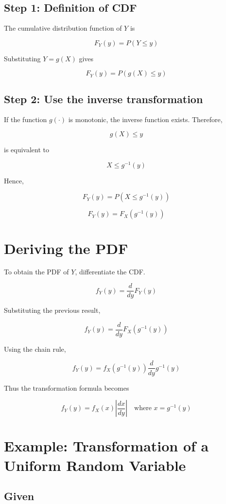 \documentclass[11pt]{article}
\begin{document}
\subsection{Step 1: Definition of CDF}

The cumulative distribution function of $Y$ is

\[
F_Y(y) = P(Y \le y)
\]

Substituting $Y = g(X)$ gives

\[
F_Y(y) = P(g(X) \le y)
\]

\subsection{Step 2: Use the inverse transformation}

If the function $g(\cdot)$ is monotonic, the inverse function exists. Therefore,

\[
g(X) \le y
\]

is equivalent to

\[
X \le g^{-1}(y)
\]

Hence,

\[
F_Y(y) = P(X \le g^{-1}(y))
\]

\[
F_Y(y) = F_X(g^{-1}(y))
\]

\section{Deriving the PDF}

To obtain the PDF of $Y$, differentiate the CDF.

\[
f_Y(y) = \frac{d}{dy} F_Y(y)
\]

Substituting the previous result,

\[
f_Y(y) = \frac{d}{dy} F_X(g^{-1}(y))
\]

Using the chain rule,

\[
f_Y(y) =
f_X(g^{-1}(y))
\frac{d}{dy} g^{-1}(y)
\]

Thus the transformation formula becomes

\[
f_Y(y) =
f_X(x)
\left|
\frac{dx}{dy}
\right|
\quad \text{where } x = g^{-1}(y)
\]

\section{Example: Transformation of a Uniform Random Variable}

\subsection{Given}
\end{document}

